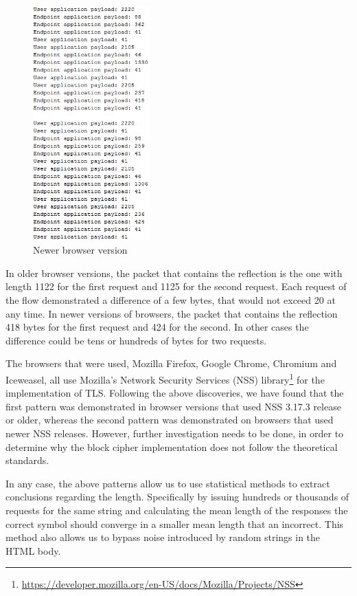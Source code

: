 \begin{figure}[H] \caption{Newer browser version} \centering
\includegraphics[width=0.4\textwidth]{diagrams/newer_browser_version.png}\end{figure}

In older browser versions, the packet that contains the reflection is the one
with length 1122 for the first request and 1125 for the second request. Each
request of the flow demonstrated a difference of a few bytes, that would not
exceed 20 at any time. In newer versions of browsers, the packet that contains
the reflection 418 bytes for the first request and 424 for the second. In other
cases the difference could be tens or hundreds of bytes for two requests.

The browsers that were used, Mozilla Firefox, Google Chrome, Chromium and Iceweasel,
all use Mozilla's Network Security Services (NSS)
library\footnote{\url{https://developer.mozilla.org/en-US/docs/Mozilla/Projects/NSS}}
for the implementation of TLS. Following the above discoveries, we have found
that the first pattern was demonstrated in browser versions that used NSS
3.17.3 release or older, whereas the second pattern was demonstrated on browsers
that used newer NSS releases. However, further investigation needs to be done,
in order to determine why the block cipher implementation does not follow the
theoretical standards.

In any case, the above patterns allow us to use statistical methods to extract
conclusions regarding the length. Specifically by issuing hundreds or thousands
of requests for the same string and calculating the mean length of the
responses the correct symbol should converge in a smaller mean length that an
incorrect. This method also allows us to bypass noise introduced by random
strings in the HTML body.

